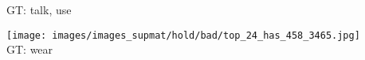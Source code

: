 \documentclass[10pt,twocolumn,letterpaper]{article}
\begin{document}
\begin{figure*}[t]
\begin{minipage}[t]{0.18\textwidth}
       	\vspace{0.3ex}
       	GT: talk, use
       	\vspace{0.2ex}
    \end{minipage}
    \hspace{0.005\textwidth}
    \begin{minipage}[t]{0.18\textwidth}
    	\centering
       	\texttt{[image: images/images\_supmat/hold/bad/top\_24\_has\_458\_3465.jpg]} \\
       	\vspace{0.3ex}
       	GT: wear
       	\vspace{0.2ex}
    \end{minipage}
     	

\end{figure*}
\end{document}
